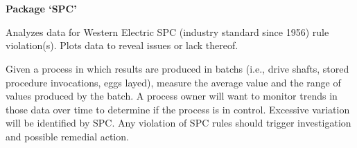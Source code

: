 \documentclass[a4paper]{book}
\begin{document}
\chapter*{}
\begin{center}
{\textbf{\huge Package `SPC'}}
\par\bigskip{\large \today}
\end{center}
\begin{description}
\raggedright{}
\item[Type]
\item[Title]
\item[Version]
\item[Date]
\item[Author]
\item[Maintainer]\AsIs{}
\item[Description]
\item[License]
\end{description}
%
\begin{Description}\relax
Analyzes data for Western Electric SPC (industry standard since 1956) rule violation(s).  Plots data to reveal issues or lack thereof.
\end{Description}
%
\begin{Details}\relax

Given a process in which results are produced in batchs (i.e., drive shafts, stored procedure invocations, eggs layed), measure the average value 
and the range of values produced by the batch.  A process owner will want to monitor trends in those data over time to determine if the process is
in control.  Excessive variation will be identified by SPC.  Any violation of SPC rules should trigger investigation and possible remedial action.
\end{Details}
\end{document}

